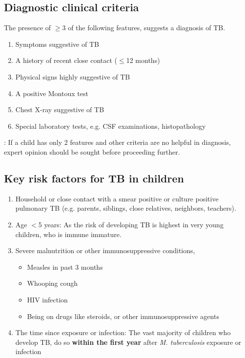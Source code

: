 \documentclass[11pt,a4paper]{report}
\begin{document}
\subsection{Diagnostic clinical criteria}
The presence of $\geq$3 of the following features, suggests a diagnosis of TB. 
\begin{enumerate}
	\item Symptoms suggestive of TB 
	\item A history of recent close contact ($\leq$12 months)
	\item Physical signs highly suggestive of TB
	\item A positive Montoux test 
	\item Chest X-ray suggestive of TB
	\item Special laboratory tests, e.g. CSF examinations, histopathology
\end{enumerate}

: If a child has only 2 features and other criteria are no helpful in diagnosis, expert opinion should be sought before proceeding further. 

\subsection[Key risk factors]{Key risk factors for TB in children}
\begin{enumerate}
	\item Household or close contact with a smear positive or culture positive pulmonary TB (e.g. parents, siblings, close relatives, neighbors, teachers). 
	\item Age $<$5 years: As the risk of developing TB is  highest in very young children, who is immune immature. 
	\item Severe malnutrition or other immunosuppressive conditions, 
	\begin{itemize}
		\item Measles in past 3 months 
		\item Whooping cough 
		\item HIV infection 
		\item Being on drugs like steroids, or other immunosuppressive agents 
	\end{itemize}
	\item The time since exposure or infection: The vast majority of children who develop TB, do so \textbf{within the first year} after \textit{M. tuberculosis} exposure or infection 
\end{enumerate}
\end{document}
